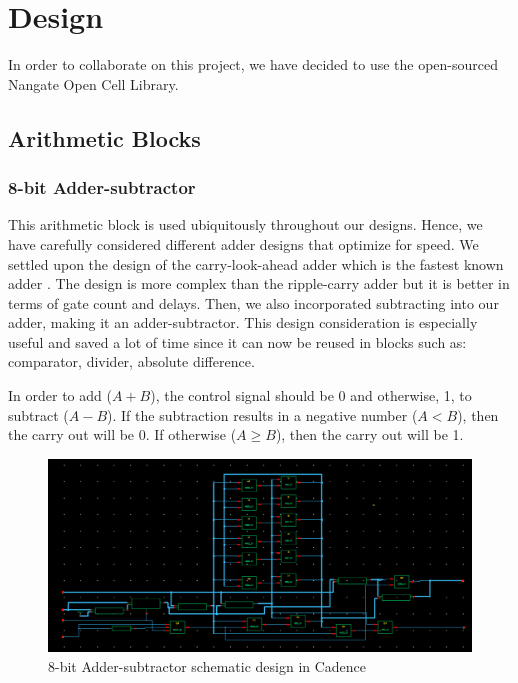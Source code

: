 \documentclass[letterpaper, 11pt]{article}
\begin{document}
	\section{Design}
	\label{sec:design}
	
	In order to collaborate on this project, we have decided to use the open-sourced Nangate Open Cell Library.
	
	\subsection{Arithmetic Blocks}
	\label{subsec:arith_blocks}
	
	\subsubsection{8-bit Adder-subtractor}
	This arithmetic block is used ubiquitously throughout our designs. Hence, we have carefully considered different adder designs that optimize for speed. We settled upon the design of the carry-look-ahead adder which is the fastest known adder \cite{5}. The design is more complex than the ripple-carry adder but it is better in terms of gate count and delays. Then, we also incorporated subtracting into our adder, making it an adder-subtractor. This design consideration is especially useful and saved a lot of time since it can now be reused in blocks such as: comparator, divider, absolute difference.
	
	In order to add ($A + B$), the control signal should be 0 and otherwise, 1, to subtract ($A - B$). If the subtraction results in a negative number ($A < B$), then the carry out will be 0. If otherwise ($A \geq B$), then the carry out will be 1.
	
	\begin{figure}[htb!]
		\centering
		\includegraphics[width=0.85\linewidth]{report_pics/addsub8b_schem.png}
		\caption{8-bit Adder-subtractor schematic design in Cadence}
		\label{fig5}
	\end{figure}
	
\end{document}
